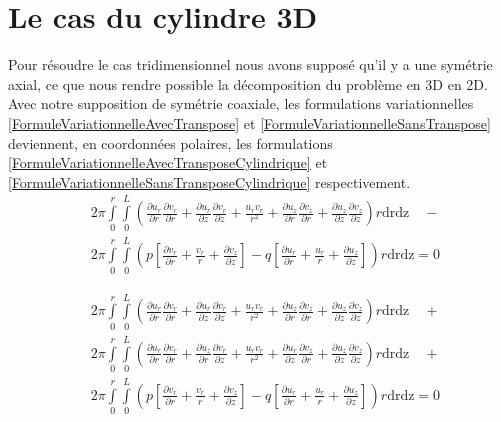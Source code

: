 \documentclass[11pt,a4paper]{article}
\numberwithin{equation}{subsection}
\numberwithin{figure}{subsection}
\begin{document}
%
%
\section{Le cas du cylindre 3D}

Pour résoudre le cas tridimensionnel nous avons supposé qu'il y a une symétrie axial, ce que nous rendre possible la décomposition du problème en 3D en 2D. Avec notre supposition de symétrie coaxiale, les formulations variationnelles \ref{FormuleVariationnelleAvecTranspose} et \ref{FormuleVariationnelleSansTranspose} deviennent, en coordonnées polaires, les formulations \ref{FormuleVariationnelleAvecTransposeCylindrique} et \ref{FormuleVariationnelleSansTransposeCylindrique} respectivement.
\begin{equation}
\begin{aligned}
& 2\pi\int\limits_0^r\int\limits_0^L \left(\frac{\partial u_r}{\partial r}\frac{\partial v_r}{\partial r} + \frac{\partial u_r}{\partial z}\frac{\partial v_r}{\partial z} + \frac{u_rv_r}{r^2} + \frac{\partial u_z}{\partial r}\frac{\partial v_z}{\partial r} + \frac{\partial u_z}{\partial z}\frac{\partial v_z}{\partial z}\right)r\mathrm{drdz}  \quad- \\
& 2\pi\int\limits_0^r\int\limits_0^L \left(p\left[\frac{\partial v_r}{\partial r} + \frac{v_r}{r} + \frac{\partial v_z}{\partial z}\right] - q\left[\frac{\partial u_r}{\partial r} + \frac{u_r}{r} + \frac{\partial u_z}{\partial z}\right]\right) r\mathrm{drdz} = 0
\end{aligned} \label{FormuleVariationnelleSansTransposeCylindrique}
\end{equation}

\begin{equation}
\begin{aligned}
& 2\pi\int\limits_0^r\int\limits_0^L \left(\frac{\partial u_r}{\partial r}\frac{\partial v_r}{\partial r} + \frac{\partial u_r}{\partial z}\frac{\partial v_r}{\partial z} + \frac{u_rv_r}{r^2} + \frac{\partial u_z}{\partial r}\frac{\partial v_z}{\partial r} + \frac{\partial u_z}{\partial z}\frac{\partial v_z}{\partial z}\right)r\mathrm{drdz}  \quad+ \\
& 2\pi\int\limits_0^r\int\limits_0^L \left(\frac{\partial u_r}{\partial r}\frac{\partial v_r}{\partial r} + \frac{\partial u_z}{\partial r}\frac{\partial v_r}{\partial z} + \frac{u_rv_r}{r^2} + \frac{\partial u_r}{\partial z}\frac{\partial v_z}{\partial r} + \frac{\partial u_z}{\partial z}\frac{\partial v_z}{\partial z}\right)r\mathrm{drdz}  \quad+ \\
& 2\pi\int\limits_0^r\int\limits_0^L \left(p\left[\frac{\partial v_r}{\partial r} + \frac{v_r}{r} + \frac{\partial v_z}{\partial z}\right] - q\left[\frac{\partial u_r}{\partial r} + \frac{u_r}{r} + \frac{\partial u_z}{\partial z}\right]\right) r\mathrm{drdz} = 0
\end{aligned} \label{FormuleVariationnelleAvecTransposeCylindrique}
\end{equation}
\end{document}

